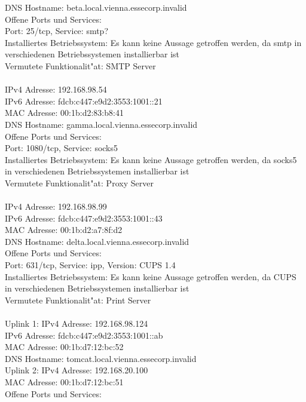 \documentclass[12pt,a4paper,titlepage,oneside]{scrartcl}
\begin{document}
DNS Hostname: beta.local.vienna.essecorp.invalid\\
Offene Ports und Services:\\
Port: 25/tcp, Service: smtp?\\
Installiertes Betriebssystem: Es kann keine Aussage getroffen werden, da smtp in verschiedenen Betriebssystemen installierbar ist\\
Vermutete Funktionalit"at: SMTP Server\\
\\
IPv4 Adresse: 192.168.98.54\\
IPv6 Adresse: fdcb:c447:e9d2:3553:1001::21\\
MAC Adresse: 00:1b:d2:83:b8:41\\
DNS Hostname: gamma.local.vienna.essecorp.invalid\\
Offene Ports und Services:\\
Port: 1080/tcp, Service: socks5\\
Installiertes Betriebssystem: Es kann keine Aussage getroffen werden, da socks5 in verschiedenen Betriebssystemen installierbar ist\\
Vermutete Funktionalit"at: Proxy Server\\
\\
IPv4 Adresse: 192.168.98.99\\
IPv6 Adresse: fdcb:c447:e9d2:3553:1001::43\\
MAC Adresse: 00:1b:d2:a7:8f:d2\\
DNS Hostname: delta.local.vienna.essecorp.invalid\\
Offene Ports und Services:\\
Port: 631/tcp, Service: ipp, Version: CUPS 1.4\\
Installiertes Betriebssystem: Es kann keine Aussage getroffen werden, da CUPS in verschiedenen Betriebssystemen installierbar ist\\
Vermutete Funktionalit"at: Print Server\\
\\
Uplink 1:
IPv4 Adresse: 192.168.98.124\\
IPv6 Adresse: fdcb:c447:e9d2:3553:1001::ab\\
MAC Adresse: 00:1b:d7:12:bc:52\\
DNS Hostname: tomcat.local.vienna.essecorp.invalid\\
Uplink 2:
IPv4 Adresse: 192.168.20.100\\
MAC Adresse: 00:1b:d7:12:bc:51\\
Offene Ports und Services:\\
\end{document}
